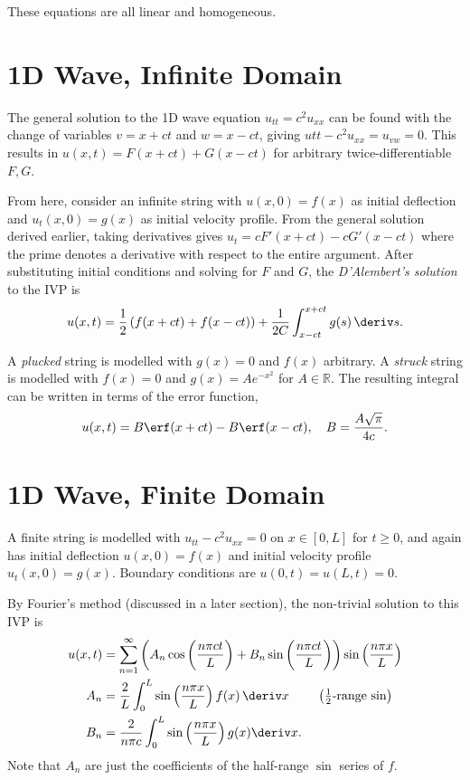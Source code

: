 \documentclass[10pt, a4paper]{article}
\begin{document}
\begin{landscape}
\begin{multicols*}{2}
    These equations are all linear and homogeneous.

    \section{1D Wave, Infinite Domain}

    The general solution to the 1D wave equation \(u_{tt} = c^2 u_{xx}\) can be found with the change of
    variables \(v = x + ct\) and \(w = x - ct\), giving \(u{tt} - c^2 u_{xx} = u_{vw} = 0\).
    This results in \(u(x, t) = F(x + ct) + G(x - ct)\) for arbitrary twice-differentiable \(F, G\).

    From here, consider an infinite string with \(u(x, 0) = f(x)\) as initial deflection
    and \(u_t(x, 0) = g(x)\) as initial velocity profile. From the general solution derived earlier,
    taking derivatives gives \(u_t = c F'(x+ct) - c G'(x - ct)\) where the prime denotes a derivative with
    respect to the entire argument. After substituting initial conditions and solving for \(F\) and \(G\),
    the \emph{D'Alembert's solution} to the IVP is
    \[
        u(x, t) = \frac{1}{2}\left(f(x + ct) + f(x - ct) \right)
        + \frac{1}{2C} \int_{x - ct}^{x + ct} g(s) \,\deriv s.
    \]

    A \emph{plucked} string is modelled with \(g(x) = 0\) and \(f(x)\) arbitrary.
    A \emph{struck} string is modelled with \(f(x) = 0\) and \(g(x) = A e^{-x^2}\) for \(A \in \mathbb{R}\).
    The resulting integral can be written in terms of the error function,
    \[
        u(x, t) = B \erf(x + ct) - B \erf(x - ct),
        \quad
        B = \frac{A \sqrt{\pi}}{4c}.
    \]

    \section{1D Wave, Finite Domain}

    A finite string is modelled with \(u_{tt} - c^2 u_{xx} = 0\) on \(x \in [0, L]\) for \(t \geq 0\),
    and again has initial deflection \(u(x, 0) = f(x)\) and initial velocity profile \(u_t(x, 0) = g(x)\).
    Boundary conditions are \(u(0, t) = u(L, t) = 0\).

    By Fourier's method (discussed in a later section), the non-trivial solution to this IVP is
    \begin{align*}
        u(x, t) &= \sum_{n=1}^{\infty} \left(
            A_n \cos\left(\frac{n \pi c t}{L}\right) + B_n \sin\left(\frac{n \pi ct}{L}\right)
        \right) \sin \left(\frac{n \pi x}{L}\right) \\
        A_n &= \frac{2}{L} \int_0^L \sin\left(\frac{n \pi x}{L}\right) f(x) \,\deriv x
            \tag*{
                \(\left(\frac{1}{2} \text{-range sin}\right)\)
            } \\
        B_n &= \frac{2}{n \pi c} \int_0^L \sin\left(\frac{n \pi x}{L}\right) g(x) \deriv x.
    \end{align*}
    Note that \(A_n\) are just the coefficients of the half-range \(\sin\) series of \(f\).


\end{multicols*}
\end{landscape}
\end{document}
